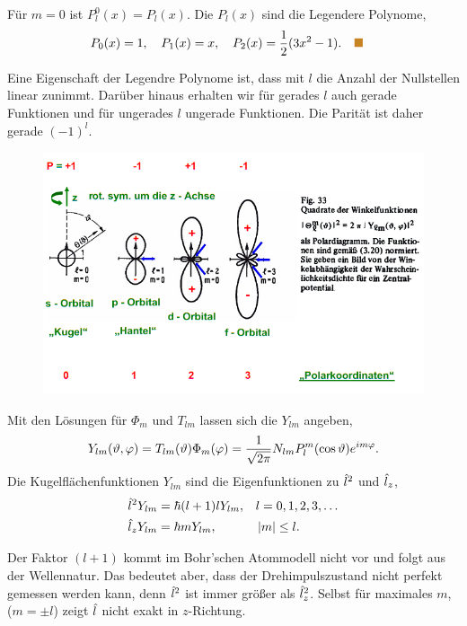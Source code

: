 \begin{bspn} Für $m=0$ ist
$P_l^0(x) = P_l(x)$. Die $P_l(x)$ sind die Legendere Polynome,
\begin{align*}
&P_0(x) = 1,\quad
P_1(x) = x,\quad
P_2(x) = \frac{1}{2}(3x^2-1).\bsphere
\end{align*}
\end{bspn}
Eine Eigenschaft der Legendre Polynome ist, dass mit $l$ die Anzahl der
Nullstellen linear zunimmt. Darüber hinaus erhalten wir für gerades $l$ auch
gerade Funktionen und für ungerades $l$ ungerade Funktionen. Die Parität ist
daher gerade $(-1)^l$.

\begin{figure}[!htbp]
	\centering
	\includegraphics[width=\textwidth]{fig/3-KnotenPolarkoordinaten.png}
\end{figure}

Mit den Lösungen für $\Phi_m$ und $T_{lm}$ lassen sich die
$Y_{lm}$ angeben,
\begin{align*}
Y_{lm}(\vartheta,\varphi) = T_{lm}(\vartheta)\Phi_m(\varphi) = \frac{1}{\sqrt{2\pi}}
N_{lm}P_l^m(\cos\vartheta)e^{im\varphi}.
\end{align*}
Die Kugelflächenfunktionen $Y_{lm}$ sind die Eigenfunktionen zu $\hat{\boldmath{l}}^2$ und $\hat{\boldmath{l}}_z$,
\begin{align*}
&\hat{\boldmath{l}}^2Y_{lm} = \hbar (l+1)l Y_{lm}, && l=0,1,2,3,\ldots\\
&\hat{\boldmath{l}}_zY_{lm} = \hbar mY_{lm}, && \left|m\right| \le l.
\end{align*}

Der Faktor $(l+1)$ kommt im Bohr'schen Atommodell nicht vor und folgt aus der
Wellennatur. Das bedeutet aber, dass der Drehimpulszustand nicht perfekt
gemessen werden kann, denn $\hat{\boldmath{l}}^2$ ist immer größer als $\hat{\boldmath{l}}_z^2$.
Selbst für maximales $m$, ($m=\pm l$) zeigt $\hat{\boldmath{l}}$ nicht exakt in
$z$-Richtung.

